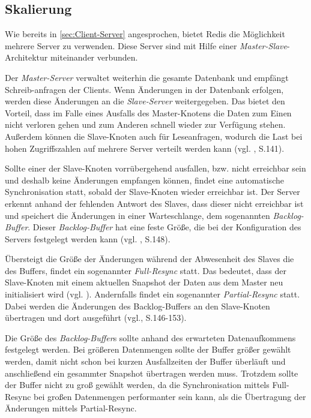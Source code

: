 
\subsection{Skalierung}
\label{sec:Skalierung}
Wie bereits in \autoref{sec:Client-Server} angesprochen, bietet \acs{Redis} die Möglichkeit mehrere Server zu verwenden.
Diese Server sind mit Hilfe einer \textit{Master-Slave}-Architektur miteinander verbunden.

Der \textit{Master-Server} verwaltet weiterhin die gesamte Datenbank und empfängt Schreib-anfragen der Clients.
Wenn Änderungen in der Datenbank erfolgen, werden diese Änderungen an die \textit{Slave-Server} weitergegeben.
Das bietet den Vorteil, dass im Falle eines Ausfalls des Master-Knotens die Daten zum Einen nicht verloren gehen und zum Anderen schnell wieder zur Verfügung stehen.
Außerdem können die Slave-Knoten auch für Leseanfragen, wodurch die Last bei hohen Zugriffszahlen auf mehrere Server verteilt werden kann \newline(vgl. \cite{3}, S.141).

Sollte einer der Slave-Knoten vorrübergehend ausfallen, bzw. nicht erreichbar sein und deshalb keine Änderungen empfangen können, findet eine automatische Synchronisation statt, sobald der Slave-Knoten wieder erreichbar ist.
Der Server erkennt anhand der fehlenden Antwort des Slaves, dass dieser nicht erreichbar ist und speichert die Änderungen in einer Warteschlange, dem sogenannten \textit{Backlog-Buffer}. 
Dieser \textit{Backlog-Buffer} hat eine feste Größe, die bei der Konfiguration des Servers festgelegt werden kann (vgl. \cite{3}, S.148). 

Übersteigt die Größe der Änderungen während der Abwesenheit des Slaves die des Buffers, findet ein sogenannter \textit{Full-Resync} statt.
Das bedeutet, dass der Slave-Knoten mit einem aktuellen Snapshot der Daten aus dem Master neu initialisiert wird (vgl. \cite{Redis-Docs-Replication}).
Andernfalls findet ein sogenannter \textit{Partial-Resync} statt. Dabei werden die Änderungen des Backlog-Buffers an den Slave-Knoten übertragen und dort ausgeführt (vgl.\cite{3}, S.146-153).

Die Größe des \textit{Backlog-Buffer}s sollte anhand des erwarteten Datenaufkommens festgelegt werden. 
Bei größeren Datenmengen sollte der Buffer größer gewählt werden, damit nicht schon bei kurzen Ausfallzeiten der Buffer überläuft und anschließend ein gesammter Snapshot übertragen werden muss.
Trotzdem sollte der Buffer nicht zu groß gewählt werden, da die Synchronisation mittels Full-Resync bei großen Datenmengen performanter sein kann, als die Übertragung der Änderungen mittels Partial-Resync.

